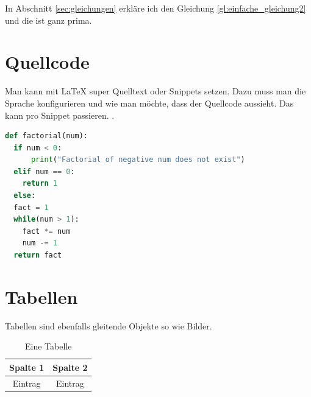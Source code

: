 In Abschnitt \ref{sec:gleichungen} erkläre ich den Gleichung \ref{gl:einfache_gleichung2} und die ist ganz prima. 

\section{Quellcode}
Man kann mit \LaTeX{} super Quelltext oder Snippets setzen. Dazu muss man die Sprache konfigurieren und wie man möchte, dass der Quellcode aussieht. Das kann pro Snippet passieren. . 
\lstset{
	numbers=left, numberstyle=\tiny, numbersep=5pt,
basicstyle=\small, %
}
\begin{lstlisting}[columns=fullflexible,showspaces=false,showtabs=false, language=Python, frame=single, caption={Fakultaetsberechnung}]
def factorial(num): 
  if num < 0: 
      print("Factorial of negative num does not exist")
  elif num == 0: 
    return 1
  else: 
  fact = 1
  while(num > 1): 
    fact *= num 
    num -= 1
  return fact 
\end{lstlisting}

\section{Tabellen}
Tabellen sind ebenfalls gleitende Objekte so wie Bilder. 
\begin{table}
	\centering
	\begin{tabular}{c|c}
		\textbf{Spalte 1} & \textbf{Spalte 2} \\
		\hline
		\hline
		Eintrag & Eintrag \\
		\hline
	\end{tabular}
	\caption{Eine Tabelle}
\end{table}

